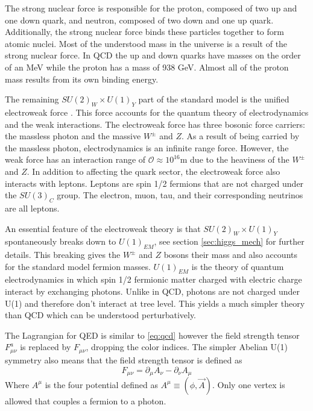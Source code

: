 The strong nuclear force is responsible for the proton, composed of two up and one down quark, and neutron, composed of two down and one up quark.
Additionally, the strong nuclear force binds these particles together to form atomic nuclei.
Most of the understood mass in the universe is a result of the strong nuclear force.
In QCD the up and down quarks have masses on the order of an MeV while the proton has a mass of 938 GeV.
Almost all of the proton mass results from its own binding energy.

The remaining $SU(2)_W\times U(1)_Y$ part of the standard model is the unified electroweak force \cite{Salam:1964ry, Weinberg:1967tq, Guralnik:1964eu, PhysRevLett.13.508, Higgs1964132, Englert:1964et, Glashow1961579}.
This force accounts for the quantum theory of electrodynamics and the weak interactions.
The electroweak force has three bosonic force carriers: the massless photon and the massive $W^\pm$ and $Z$.
As a result of being carried by the massless photon, electrodynamics is an infinite range force.
However, the weak force has an interaction range of $\mathcal{O}\approx10^{16}$m due to the heaviness of the $W^{\pm}$ and $Z$.
In addition to affecting the quark sector, the electroweak force also interacts with leptons.
Leptons are spin 1/2 fermions that are not charged under the $SU(3)_C$ group. 
The electron, muon, tau, and their corresponding neutrinos are all leptons.

An essential feature of the electroweak theory is that $SU(2)_W\times U(1)_Y$ spontaneously breaks down to $U(1)_{EM}$, see section \ref{sec:higgs_mech} for further details.
This breaking gives the $W^\pm$ and $Z$ bosons their mass and also accounts for the standard model fermion masses.
$U(1)_{EM}$ is the theory of quantum electrodynamics in which spin 1/2 fermionic matter charged with electric charge interact by exchanging photons.
Unlike in QCD, photons are not charged under U(1) and therefore don't interact at tree level.
This yields a much simpler theory than QCD which can be understood perturbatively.

The Lagrangian for QED is similar to \ref{eq:qcd} however the field strength tensor $F^a_{\mu\nu}$ is replaced by $F_{\mu\nu}$, dropping the color indices.
The simpler Abelian U(1) symmetry also means that the field strength tensor is defined as
\begin{equation}
  F_{\mu\nu}=\partial_\mu A_\nu - \partial_\nu A_\mu
\end{equation}
Where $A^\mu$ is the four potential defined as $A^\mu \equiv (\phi, \vec{A})$.
Only one vertex is allowed that couples a fermion to a photon.

